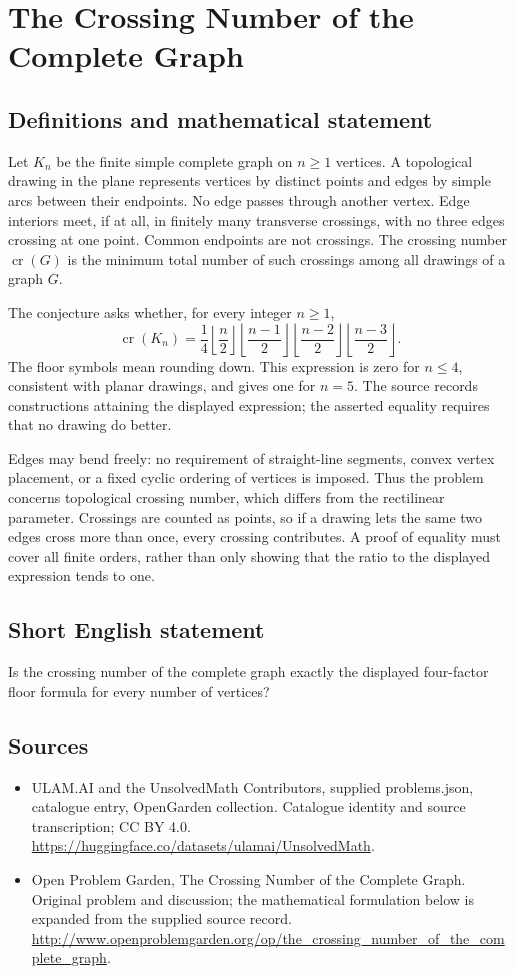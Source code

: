 \documentclass[11pt,a4paper]{article}
\begin{document}
\section*{The Crossing Number of the Complete Graph}\label{statement}

\subsection{Definitions and mathematical statement}
Let $K_n$ be the finite simple complete graph on $n\ge1$ vertices.
A topological drawing in the plane represents vertices by distinct
points and edges by simple arcs between their endpoints. No edge
passes through another vertex. Edge interiors meet, if at all, in
finitely many transverse crossings, with no three edges crossing
at one point. Common endpoints are not crossings. The crossing
number $\operatorname{cr}(G)$ is the minimum total number of such
crossings among all drawings of a graph $G$.

The conjecture asks whether, for every integer $n\ge1$,
\[
 \operatorname{cr}(K_n)=
 \frac14\left\lfloor\frac n2\right\rfloor
          \left\lfloor\frac{n-1}2\right\rfloor
          \left\lfloor\frac{n-2}2\right\rfloor
          \left\lfloor\frac{n-3}2\right\rfloor.
\]
The floor symbols mean rounding down. This expression is zero for
$n\le4$, consistent with planar drawings, and gives one for $n=5$.
The source records constructions attaining the displayed expression;
the asserted equality requires that no drawing do better.

Edges may bend freely: no requirement of straight-line segments,
convex vertex placement, or a fixed cyclic ordering of vertices is
imposed. Thus the problem concerns topological crossing number,
which differs from the rectilinear parameter. Crossings are counted
as points, so if a drawing lets the same two edges cross more than
once, every crossing contributes. A proof of equality must cover
all finite orders, rather than only showing that the ratio to the
displayed expression tends to one.
\subsection{Short English statement}
Is the crossing number of the complete graph exactly the displayed four-factor floor formula for every number of vertices?
\subsection{Sources}
\begin{itemize}
\item[S1] ULAM.AI and the UnsolvedMath Contributors, supplied problems.json, catalogue entry, OpenGarden collection. Catalogue identity and source transcription; CC BY 4.0.
\url{https://huggingface.co/datasets/ulamai/UnsolvedMath}.
\item[S2] Open Problem Garden, The Crossing Number of the Complete Graph. Original problem and discussion; the mathematical formulation below is expanded from the supplied source record.
\url{http://www.openproblemgarden.org/op/the_crossing_number_of_the_complete_graph}.
\end{itemize}
\end{document}
